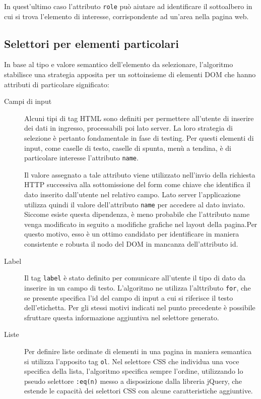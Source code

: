 In quest'ultimo caso l'attributo \verb|role| può aiutare ad identificare il sottoalbero in cui si trova l'elemento di interesse, corrispondente ad un'area nella pagina web.

\subsection {Selettori per elementi particolari}

In base al tipo e valore semantico dell'elemento da selezionare, l'algoritmo stabilisce una strategia apposita per un sottoinsieme di elementi DOM che hanno attributi di particolare significato:

\begin{description}
\item[Campi di input] Alcuni tipi di tag HTML sono definiti per permettere all'utente di inserire dei dati in ingresso, processabili poi lato server. La loro strategia di selezione è pertanto fondamentale in fase di testing. Per questi elementi di input, come caselle di testo, caselle di spunta, menù a tendina, è di particolare interesse l'attributo \verb|name|. 

Il valore assegnato a tale attributo viene utilizzato nell'invio della richiesta HTTP successiva alla sottomissione del form come chiave che identifica il dato inserito dall'utente nel relativo campo. Lato server l'applicazione utilizza quindi il valore dell'attributo \verb|name| per accedere al dato inviato. Siccome esiste questa dipendenza, è meno probabile che l'attributo name venga modificato in seguito a modifiche grafiche nel layout della pagina.Per questo motivo, esso è un ottimo candidato per identificare in maniera consistente e robusta il nodo del DOM in mancanza dell'attributo id.

\item[Label] Il tag \verb|label| è stato definito per comunicare all'utente il tipo di dato da inserire in un campo di testo. L'algoritmo ne utilizza l'alttributo \verb|for|, che se presente specifica l'id del campo di input a cui si riferisce il testo dell'etichetta. Per gli stessi motivi indicati nel punto precedente è possibile sfruttare questa informazione aggiuntiva nel selettore generato.

\item[Liste] Per definire liste ordinate di elementi in una pagina in maniera semantica si utilizza l'apposito tag \verb|ol|. Nel selettore CSS che individua una voce specifica della lista, l'algoritmo specifica sempre l'ordine, utilizzando lo pseudo selettore \verb|:eq(n)| messo a disposizione dalla libreria jQuery, che estende le capacità dei selettori CSS con alcune caratteristiche aggiuntive.


\end{description}
